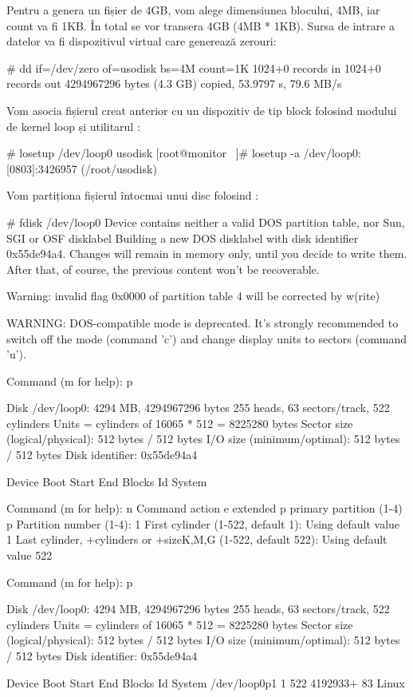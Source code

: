 Pentru a genera un fișier de 4GB, vom alege dimensiunea blocului, 4MB, iar count
va fi 1KB. În total se vor transera 4GB (4MB * 1KB). Sursa de intrare a datelor
va fi dispozitivul virtual  care generează zerouri:

\begin{screen}
# dd if=/dev/zero of=usodisk bs=4M count=1K
1024+0 records in
1024+0 records out
4294967296 bytes (4.3 GB) copied, 53.9797 s, 79.6 MB/s
\end{screen}

Vom asocia fișierul creat anterior cu un dispozitiv de tip block folosind
modului de kernel loop și utilitarul :

\begin{screen}
# losetup /dev/loop0 usodisk
[root@monitor ~]# losetup -a
/dev/loop0: [0803]:3426957 (/root/usodisk)
\end{screen}

Vom partiționa fișierul întocmai unui disc folosind :

\begin{screen}
# fdisk /dev/loop0
Device contains neither a valid DOS partition table, nor Sun, SGI or OSF disklabel
Building a new DOS disklabel with disk identifier 0x55de94a4.
Changes will remain in memory only, until you decide to write them.
After that, of course, the previous content won't be recoverable.


Warning: invalid flag 0x0000 of partition table 4 will be corrected by w(rite)


WARNING: DOS-compatible mode is deprecated. It's strongly recommended to
         switch off the mode (command 'c') and change display units to
         sectors (command 'u').


Command (m for help): p


Disk /dev/loop0: 4294 MB, 4294967296 bytes
255 heads, 63 sectors/track, 522 cylinders
Units = cylinders of 16065 * 512 = 8225280 bytes
Sector size (logical/physical): 512 bytes / 512 bytes
I/O size (minimum/optimal): 512 bytes / 512 bytes
Disk identifier: 0x55de94a4


      Device Boot      Start         End      Blocks   Id  System


Command (m for help): n
Command action
   e   extended
   p   primary partition (1-4)
p
Partition number (1-4): 1
First cylinder (1-522, default 1):
Using default value 1
Last cylinder, +cylinders or +size{K,M,G} (1-522, default 522):
Using default value 522


Command (m for help): p


Disk /dev/loop0: 4294 MB, 4294967296 bytes
255 heads, 63 sectors/track, 522 cylinders
Units = cylinders of 16065 * 512 = 8225280 bytes
Sector size (logical/physical): 512 bytes / 512 bytes
I/O size (minimum/optimal): 512 bytes / 512 bytes
Disk identifier: 0x55de94a4


      Device Boot      Start         End      Blocks   Id  System
/dev/loop0p1               1         522     4192933+  83  Linux
\end{screen}


